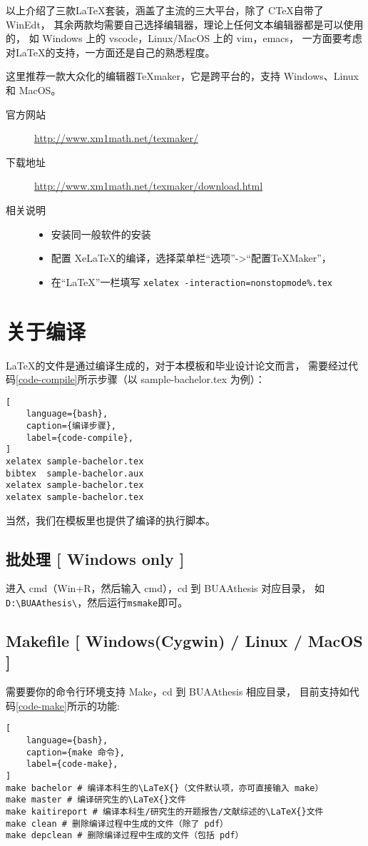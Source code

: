 \documentclass[master,openright,twoside,color,AutoFakeBold=true]{misc/buaathesis}
\begin{document}
以上介绍了三款\LaTeX{}套装，涵盖了主流的三大平台，除了 C\TeX{}自带了 WinEdt，
其余两款均需要自己选择编辑器，理论上任何文本编辑器都是可以使用的，
如 Windows 上的 vscode，Linux/MacOS 上的 vim，emacs，
一方面要考虑对\LaTeX{}的支持，一方面还是自己的熟悉程度。

这里推荐一款大众化的编辑器\TeX{}maker，它是跨平台的，支持 Windows、Linux 和 MacOS。

\begin{description}
    \item[官方网站]
        \url{http://www.xm1math.net/texmaker/}
    \item[下载地址]
        \url{http://www.xm1math.net/texmaker/download.html}
    \item[相关说明]
    \begin{itemize}
        \item 安装同一般软件的安装
        \item 配置 Xe\LaTeX{}的编译，选择菜单栏“选项”->“配置\TeX{}Maker”，
        \item[] 在“\LaTeX{}”一栏填写
            \texttt{xelatex -interaction=nonstopmode\%.tex}
    \end{itemize}
\end{description}

\section{关于编译}

\LaTeX{}的文件是通过编译生成的，对于本模板和毕业设计论文而言，
需要经过代码\ref{code-compile}所示步骤（以 sample-bachelor.tex 为例）：
\begin{lstlisting}[
    language={bash},
    caption={编译步骤},
    label={code-compile},
]
xelatex sample-bachelor.tex
bibtex  sample-bachelor.aux
xelatex sample-bachelor.tex
xelatex sample-bachelor.tex
\end{lstlisting}
当然，我们在模板里也提供了编译的执行脚本。

\subsection{批处理 [ Windows only ]}

进入 cmd（Win+R，然后输入 cmd），cd 到 BUAAthesis 对应目录，
如\verb|D:\BUAAthesis\|，然后运行\verb|msmake|即可。

\subsection{Makefile [ Windows(Cygwin) / Linux / MacOS ]}
需要要你的命令行环境支持 Make，cd 到 BUAAthesis 相应目录，
目前支持如代码\ref{code-make}所示的功能:
\begin{lstlisting}[
    language={bash},
    caption={make 命令},
    label={code-make},
]
make bachelor # 编译本科生的\LaTeX{}（文件默认项，亦可直接输入 make）
make master # 编译研究生的\LaTeX{}文件
make kaitireport # 编译本科生/研究生的开题报告/文献综述的\LaTeX{}文件
make clean # 删除编译过程中生成的文件（除了 pdf）
make depclean # 删除编译过程中生成的文件（包括 pdf）
\end{lstlisting}

\ifdefined\maindoc
\else
  
  
\end{document}
